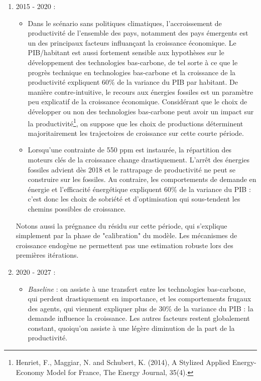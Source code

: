 \documentclass[a4,11pt]{aleph-notas}
\begin{document}
\begin{enumerate}
    \item 2015 - 2020 : 
    \begin{itemize}
        \item Dans le scénario sans politiques climatiques, l'accroissement de productivité de l'ensemble des pays, notamment des pays émergents est un des principaux facteurs influançant la croissance économique. Le PIB/habitant est aussi fortement sensible aux hypothèses sur le développement des technologies bas-carbone, de tel sorte à ce que le progrès technique en technologies bas-carbone et la croissance de la productivité expliquent 60\% de la variance du PIB par habitant. De manière contre-intuitive, le recours aux énergies fossiles est un paramètre peu explicatif de la croissance économique. Considérant que le choix de développer ou non des technologies bas-carbone peut avoir un impact sur la productivité\footnote{Henriet, F., Maggiar, N. and Schubert, K. (2014), A Stylized Applied Energy-Economy Model for France, The Energy Journal, 35(4).}, on suppose que les choix de productions déterminent majoritairement les trajectoires de croissance sur cette courte période.
        \item Lorsqu'une contrainte de 550 ppm est instaurée, la répartition des moteurs clés de la croissance change drastiquement. L'arrêt des énergies fossiles advient dès 2018 et le rattrapage de productivité ne peut se construire sur les fossiles. Au contraire, les comportements de demande en énergie et l'efficacité énergétique expliquent 60\% de la variance du PIB : c'est donc les choix de sobriété et d'optimisation qui sous-tendent les chemins possibles de croissance.
    \end{itemize}
    Notons aussi la prégnance du résidu sur cette période, qui s'explique simplement par la phase de "calibration" du modèle. Les mécanismes de croissance endogène ne permettent pas une estimation robuste lors des premières itérations.
    \item 2020 - 2027 : 
    \begin{itemize}
        \item \textit{Baseline} : on assiste à une transfert entre les technologies bas-carbone, qui perdent drastiquement en importance, et les comportements frugaux des agents, qui viennent expliquer plus de 30\% de la variance du PIB : la demande influence la croissance. Les autres facteurs restent globalement constant, quoiqu'on assiste à une légère diminution de la part de la productivité. 

\end{itemize}
\end{enumerate}
\end{document}
